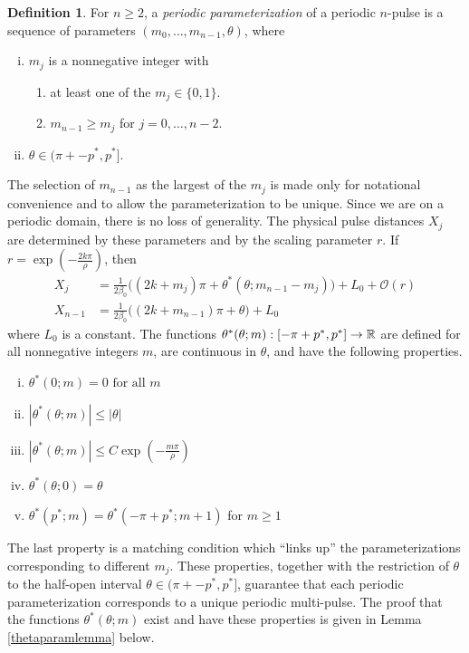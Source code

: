 \documentclass[11pt,reqno]{amsart}
\theoremstyle{plain}
\theoremstyle{definition}
\newtheorem{definition}[theorem]{Definition}
\theoremstyle{remark}
\begin{document}
\begin{definition}\label{def:perparam}
For $n \geq 2$, a \emph{periodic parameterization} of a periodic $n$-pulse is a sequence of parameters $(m_0, \dots, m_{n-1}, \theta)$, where
\begin{enumerate}[(i)]
\item $m_j$ is a nonnegative integer with
\begin{enumerate}
\item at least one of the $m_j \in \{0, 1\}$.
\item $m_{n-1} \geq m_j$ for $j = 0, \dots, n-2$.
\end{enumerate}
\item $\theta \in (\pi + -p^*, p^*]$.
\end{enumerate}
\end{definition}
The selection of $m_{n-1}$ as the largest of the $m_j$ is made only for notational convenience and to allow the parameterization to be unique. Since we are on a periodic domain, there is no loss of generality. The physical pulse distances $X_j$ are determined by these parameters and by the scaling parameter $r$. If $r = \exp\left(-\frac{2 k \pi}{\rho}\right)$, then
\begin{align*}
X_j &= \frac{1}{2 \beta_0}\big( (2 k + m_j)\pi + \theta^*(\theta; m_{n-1} - m_j)\big) + L_0 + \mathcal{O}(r) \\
X_{n-1} &= \frac{1}{2 \beta_0}\big( (2 k + m_{n-1})\pi + \theta \big) + L_0
\end{align*}
where $L_0$ is a constant. The functions $\theta^*(\theta; m): [-\pi + p^*, p^*] \rightarrow \mathbb{R}$ are defined for all nonnegative integers $m$, are continuous in $\theta$, and have the following properties.
\begin{enumerate}[(i)]
\item $\theta^*(0; m) = 0 \text{ for all } m$
\item $|\theta^*(\theta; m)| \leq |\theta|$
\item $|\theta^*(\theta; m)| \leq C \exp\left(-\frac{m \pi}{\rho} \right)$
\item $\theta^*(\theta; 0) = \theta $
\item $\theta^*(p^*; m) = \theta^*(-\pi+p^*; m+1)$ for $m \geq 1$
\end{enumerate}
The last property is a matching condition which ``links up'' the parameterizations corresponding to different $m_j$. These properties, together with the restriction of $\theta$ to the half-open interval $\theta \in (\pi + -p^*, p^*]$, guarantee that each periodic parameterization corresponds to a unique periodic multi-pulse. The proof that the functions $\theta^*(\theta; m)$ exist and have these properties is given in Lemma \ref{thetaparamlemma} below.
\end{document}
